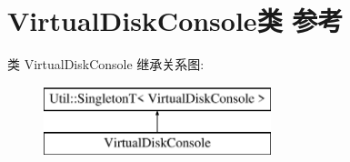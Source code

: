 \hypertarget{class_virtual_disk_console}{\section{Virtual\-Disk\-Console类 参考}
\label{class_virtual_disk_console}
}
类 Virtual\-Disk\-Console 继承关系图\-:\begin{figure}[H]
\begin{center}
\leavevmode
\includegraphics[height=2.000000cm]{class_virtual_disk_console}
\end{center}
\end{figure}
